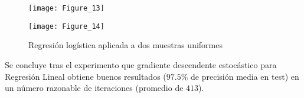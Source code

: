 \begin{figure}[H]
  \caption{Regresión logística aplicada a dos muestras uniformes}\par\medskip
  \begin{minipage}[b]{.5\linewidth}
    \centering
    \texttt{[image: Figure\_13]}
     \label{subfig-4:dummy78}
  \end{minipage}
  \hfill \hfill
  \begin{minipage}[b]{.5\linewidth}
    \centering
    \texttt{[image: Figure\_14]}
  \end{minipage}
  \label{fig:dummy78}
\end{figure}

Se concluye tras el experimento que gradiente descendente estocástico para
Regresión Lineal obtiene buenos resultados ($97.5 \%$ de precisión media en
test) en un número razonable de iteraciones (promedio de $413$).